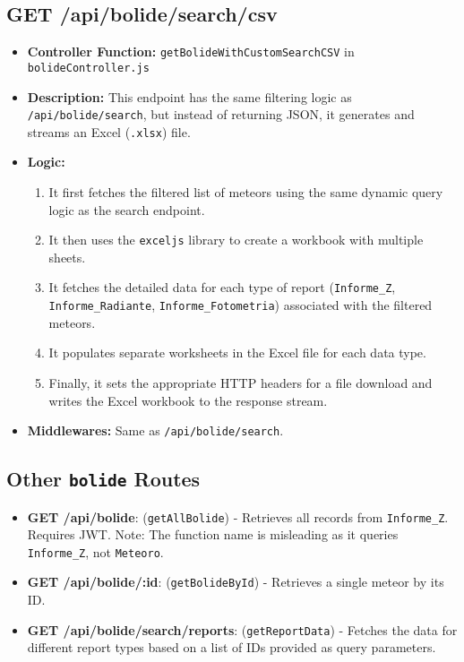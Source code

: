 \documentclass{article}
\begin{document}
\subsection{GET /api/bolide/search/csv}
\begin{itemize}
    \item \textbf{Controller Function:} \texttt{getBolideWithCustomSearchCSV} in \texttt{bolideController.js}
    \item \textbf{Description:} This endpoint has the same filtering logic as \texttt{/api/bolide/search}, but instead of returning JSON, it generates and streams an Excel (\texttt{.xlsx}) file.
    \item \textbf{Logic:}
    \begin{enumerate}
        \item It first fetches the filtered list of meteors using the same dynamic query logic as the search endpoint.
        \item It then uses the \texttt{exceljs} library to create a workbook with multiple sheets.
        \item It fetches the detailed data for each type of report (\texttt{Informe\_Z}, \texttt{Informe\_Radiante}, \texttt{Informe\_Fotometria}) associated with the filtered meteors.
        \item It populates separate worksheets in the Excel file for each data type.
        \item Finally, it sets the appropriate HTTP headers for a file download and writes the Excel workbook to the response stream.
    \end{enumerate}
    \item \textbf{Middlewares:} Same as \texttt{/api/bolide/search}.
\end{itemize}

\subsection{Other \texttt{bolide} Routes}
\begin{itemize}
    \item \textbf{GET /api/bolide}: (\texttt{getAllBolide}) - Retrieves all records from \texttt{Informe\_Z}. Requires JWT. Note: The function name is misleading as it queries \texttt{Informe\_Z}, not \texttt{Meteoro}.
    \item \textbf{GET /api/bolide/:id}: (\texttt{getBolideById}) - Retrieves a single meteor by its ID.
    \item \textbf{GET /api/bolide/search/reports}: (\texttt{getReportData}) - Fetches the data for different report types based on a list of IDs provided as query parameters.
\end{itemize}
\end{document}
